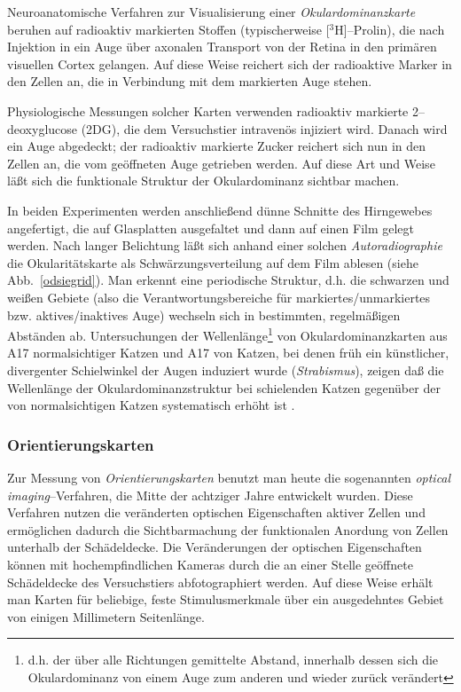 Neuroanatomische Verfahren zur Visualisierung einer
\emph{Okulardominanzkarte} beruhen auf radioaktiv markierten Stoffen
(typischerweise [$^3$H]--Prolin), die nach Injektion in ein Auge über
axonalen Transport von der Retina in den primären visuellen Cortex
gelangen.  Auf diese Weise reichert sich der radioaktive Marker in den
Zellen an, die in Verbindung mit dem markierten Auge stehen.

Physiologische Messungen solcher Karten verwenden radioaktiv markierte
\mbox{2--deoxyglucose} (2DG), die dem Versuchstier intravenös injiziert
wird. Danach wird ein Auge abgedeckt; der radioaktiv markierte Zucker
reichert sich nun in den Zellen an, die vom geöffneten Auge getrieben
werden. Auf diese Art und Weise läßt sich die funktionale Struktur der
Okulardominanz sichtbar machen.

\setcounter{footnote}{1}
In beiden Experimenten werden anschließend dünne Schnitte des Hirngewebes
angefertigt, die auf Glasplatten ausgefaltet und dann auf einen Film gelegt
werden. Nach langer Belichtung läßt sich anhand einer solchen
\emph{Autoradiographie} die Okularitätskarte als Schwärzungsverteilung
auf dem Film ablesen (siehe Abb.~\ref{odsiegrid}). Man erkennt eine
periodische Struktur, d.h. die schwarzen und weißen Gebiete (also die
Verantwortungsbereiche für markiertes/unmarkiertes bzw. aktives/inaktives
Auge) wechseln sich in bestimmten, regelmäßigen Abständen ab.
Untersuchungen der Wellenlänge\footnote{d.h. der über alle Richtungen
gemittelte Abstand, innerhalb dessen sich die Okulardominanz von einem Auge
zum anderen und wieder zurück verändert} von Okulardominanzkarten aus A17
normalsichtiger Katzen und A17 von Katzen, bei denen früh ein
künstlicher, divergenter Schielwinkel der Augen induziert wurde
(\emph{Strabismus}), zeigen daß die Wellenlänge der
Okulardominanzstruktur bei schielenden Katzen gegenüber der von
normalsichtigen Katzen systematisch erhöht ist \cite{loewel:1994}.
\setcounter{footnote}{1}

\subsubsection{Orientierungskarten}

Zur Messung von \emph{Orientierungskarten} benutzt man heute die
sogenannten \emph{optical imaging}--Verfahren, die Mitte der achtziger
Jahre entwickelt wurden. Diese Verfahren nutzen die veränderten optischen
Eigenschaften aktiver Zellen und ermöglichen dadurch die Sichtbarmachung
der funktionalen Anordung von Zellen unterhalb der Schädeldecke. Die
Veränderungen der optischen Eigenschaften können mit hochempfindlichen
Kameras durch die an einer Stelle geöffnete Schädeldecke des
Versuchstiers abfotographiert werden.  Auf diese Weise erhält man Karten
für beliebige, feste Stimulusmerkmale über ein ausgedehntes Gebiet von
einigen Millimetern Seitenlänge.

